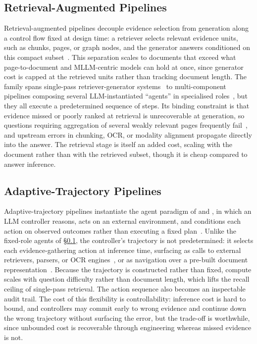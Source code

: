 \documentclass[11pt]{article}
\begin{document}
\subsection{Retrieval-Augmented Pipelines}
\label{sec:arch-ra}
Retrieval-augmented pipelines decouple evidence selection from generation along a control flow fixed at design time: a retriever selects relevant evidence units, such as chunks, pages, or graph nodes, and the generator answers conditioned on this compact subset~\cite{cho2024m3docrag, tanaka2025vdocrag}. This separation scales to documents that exceed what page-to-document and MLLM-centric models can hold at once, since generator cost is capped at the retrieved units rather than tracking document length. The family spans single-pass retriever-generator systems~\cite{cho2024m3docrag} to multi-component pipelines composing several LLM-instantiated ``agents'' in specialised roles~\cite{han2025mdocagent, duan2025m2rag}, but they all execute a predetermined sequence of steps. Its binding constraint is that evidence missed or poorly ranked at retrieval is unrecoverable at generation, so questions requiring aggregation of several weakly relevant pages frequently fail~\cite{wu2025molorag}, and upstream errors in chunking, OCR, or modality alignment propagate directly into the answer. The retrieval stage is itself an added cost, scaling with the document rather than with the retrieved subset, though it is cheap compared to answer inference.

\subsection{Adaptive-Trajectory Pipelines}
\label{sec:arch-agent}
Adaptive-trajectory pipelines instantiate the agent paradigm of \citeauthor{plaat2025agentic} and \citeauthor{wang2024survey}, in which an LLM controller reasons, acts on an external environment, and conditions each action on observed outcomes rather than executing a fixed plan~\cite{zheng2026docvstar, sun2025docagent}. Unlike the fixed-role agents of \S\ref{sec:arch-ra}, the controller's trajectory is not predetermined: it selects each evidence-gathering action at inference time, surfacing as calls to external retrievers, parsers, or OCR engines~\cite{wang2025vidorag, yu2025mact}, or as navigation over a pre-built document representation~\cite{jain2025simpledoc, fu2026dmap}. Because the trajectory is constructed rather than fixed, compute scales with question difficulty rather than document length, which lifts the recall ceiling of single-pass retrieval. The action sequence also becomes an inspectable audit trail. The cost of this flexibility is controllability: inference cost is hard to bound, and controllers may commit early to wrong evidence and continue down the wrong trajectory without surfacing the error, but the trade-off is worthwhile, since unbounded cost is recoverable through engineering whereas missed evidence is not.
\end{document}
